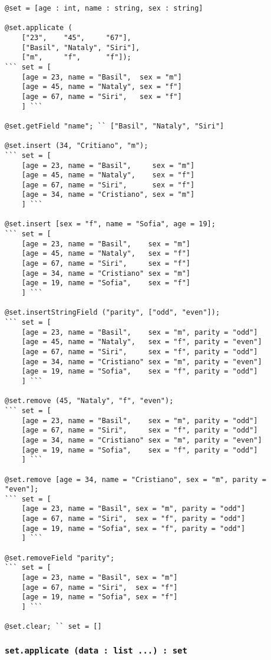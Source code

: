 \begin{lstlisting}[caption=Методы класса set, label=setmethods]
@set = [age : int, name : string, sex : string]

@set.applicate (
	["23",    "45",     "67"],
	["Basil", "Nataly", "Siri"],
	["m",     "f",      "f"]);
``` set = [
    [age = 23, name = "Basil",  sex = "m"]
	[age = 45, name = "Nataly", sex = "f"]
	[age = 67, name = "Siri",   sex = "f"]
	] ```

@set.getField "name"; `` ["Basil", "Nataly", "Siri"]

@set.insert (34, "Critiano", "m");
``` set = [
    [age = 23, name = "Basil",     sex = "m"]
	[age = 45, name = "Nataly",    sex = "f"]
	[age = 67, name = "Siri",      sex = "f"]
	[age = 34, name = "Cristiano", sex = "m"]
	] ```

@set.insert [sex = "f", name = "Sofia", age = 19];
``` set = [
    [age = 23, name = "Basil",    sex = "m"]
	[age = 45, name = "Nataly",   sex = "f"]
	[age = 67, name = "Siri",     sex = "f"]
	[age = 34, name = "Cristiano" sex = "m"]
	[age = 19, name = "Sofia",    sex = "f"]
	] ```

@set.insertStringField ("parity", ["odd", "even"]);
``` set = [
    [age = 23, name = "Basil",    sex = "m", parity = "odd"]
	[age = 45, name = "Nataly",   sex = "f", parity = "even"]
	[age = 67, name = "Siri",     sex = "f", parity = "odd"]
	[age = 34, name = "Cristiano" sex = "m", parity = "even"]
	[age = 19, name = "Sofia",    sex = "f", parity = "odd"]
	] ```

@set.remove (45, "Nataly", "f", "even");
``` set = [
    [age = 23, name = "Basil",    sex = "m", parity = "odd"]
	[age = 67, name = "Siri",     sex = "f", parity = "odd"]
	[age = 34, name = "Cristiano" sex = "m", parity = "even"]
	[age = 19, name = "Sofia",    sex = "f", parity = "odd"]
	] ```

@set.remove [age = 34, name = "Cristiano", sex = "m", parity = "even"];
``` set = [
    [age = 23, name = "Basil", sex = "m", parity = "odd"]
	[age = 67, name = "Siri",  sex = "f", parity = "odd"]
	[age = 19, name = "Sofia", sex = "f", parity = "odd"]
	] ```

@set.removeField "parity";
``` set = [
    [age = 23, name = "Basil", sex = "m"]
	[age = 67, name = "Siri",  sex = "f"]
	[age = 19, name = "Sofia", sex = "f"]
	] ```

@set.clear; `` set = []
\end{lstlisting}

\subsubsection{\lstinline|set.applicate (data : list ...) : set|}

